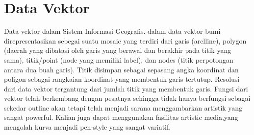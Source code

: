 


\section{Data Vektor}
Data vektor dalam Sistem Informasi Geografis. dalam  data vektor bumi direpresentasikan sebegai suatu mosaic yang terdiri dari garis (arclline), polygon (daerah yang dibatasi oleh garis yang berawal dan berakhir pada titik yang sama), titik/point (node yang memiliki label), dan nodes (titik perpotongan antara dua buah garis). Titik disimpan sebagai sepasang angka koordinat dan poligon sebagai rangkaian koordinat yang membentuk garis tertutup. Resolusi dari data vektor tergantung dari jumlah titik yang membentuk garis.
Fungsi dari vektor telah berkembang dengan pesatnya sehingga tidak hanya berfungsi sebagai sekedar outline akan tetapi telah menjadi sarana menggambarkan artistik yang sangat powerful. Kalian juga dapat menggunakan fasilitas artistic media,yang mengolah kurva menjadi pen-style yang sangat variatif. 
